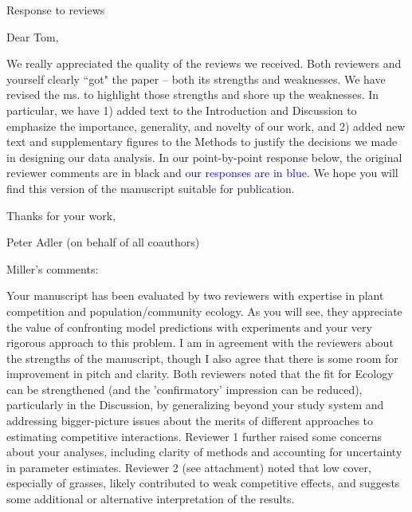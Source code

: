 \documentclass[12pt]{article}
\newcommand{\response}{\textcolor{blue}}
\begin{document}
 
\centerline{\large{Response to reviews}} 


\normalsize 

Dear Tom,

We really appreciated the quality of the reviews we received. Both reviewers and yourself clearly ``got" the paper -- both its strengths and weaknesses. We have revised the ms. to highlight those strengths and shore up the weaknesses. In particular, we have 1) added text to the Introduction and Discussion to emphasize the importance, generality, and novelty of our work, and 2) added new text and supplementary figures to the Methods to justify the decisions we made in designing our data analysis. In our point-by-point response below, the original reviewer comments are in black and \response{our responses are in blue.} We hope you will find this version of the manuscript suitable for publication.

Thanks for your work,

Peter Adler (on behalf of all coauthors)

Miller's comments: 

Your manuscript has been evaluated by two reviewers with expertise in plant competition and population/community ecology. As you will see, they appreciate the value of confronting model predictions with experiments and your very rigorous approach to this problem. I am in agreement with the reviewers about the strengths of the manuscript, though I also agree that there is some room for improvement in pitch and clarity. Both reviewers noted that the fit for Ecology can be strengthened (and the 'confirmatory' impression can be reduced), particularly in the Discussion, by generalizing beyond your study system and addressing bigger-picture issues about the merits of different approaches to estimating competitive interactions. Reviewer 1 further raised some concerns about your analyses, including clarity of methods and accounting for uncertainty in parameter estimates. Reviewer 2 (see attachment) noted that low cover, especially of grasses, likely contributed to weak competitive effects, and suggests some additional or alternative interpretation of the results. 
\end{document}
